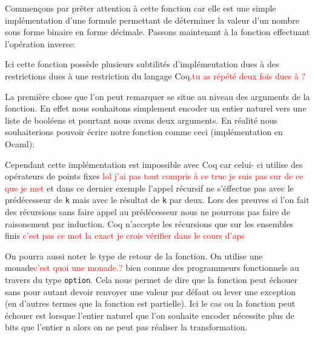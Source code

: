 \documentclass {article}
\newcommand{\codefrom}[3]
           {}
\newcommand{\codefromOcaml}[3]
           {}
\theoremstyle{definition}
\theoremstyle{remark}
\newcommand{\todo}[1]{\textcolor{red}{#1}}
\newcommand{\fun}[1]{\lstinline!#1!}
\begin{document}
\codefrom{src}{binary}{bitn}

Commençons par prêter attention à cette fonction car elle est une simple implémentation
d'une formule permettant de déterminer la valeur d'un nombre sous forme binaire
en forme décimale. Passons maintenant à la fonction effectuant l'opération inverse:

\codefrom{src}{binary}{nbit}


Ici cette fonction possède plusieurs subtilités d'implémentation dues à des restrictions dues
à une restriction du langage Coq.\todo{tu as répété deux fois dues à ?}

La première chose que l'on peut remarquer se situe au niveau des arguments de
la fonction. En effet nous souhaitons simplement encoder un entier naturel vers
une liste de booléens et pourtant nous avons deux arguments.
En réalité nous souhaiterions pouvoir écrire notre fonction comme ceci
(implémentation en Ocaml):
\codefromOcaml{rapport}{example}{nbit}

Cependant cette implémentation est impossible avec Coq car celui- ci utilise
des opérateurs de points fixes \todo{lol j'ai pas tout compris à ce truc je suis
  pas sur de ce que je met} et dans ce dernier exemple l'appel récursif ne s'éffectue
pas avec le prédécesseur de \fun{k}  mais avec le
résultat de \fun{k} par deux. Lors des preuves si l'on fait des récursions sans faire appel
au prédécesseur nous ne pourrons pas faire de raisonement par induction. Coq n'accepte les
récursions que sur les ensembles finis \todo{c'est pas ce mot la exact je crois vérifier dans le cours d'aps}



On pourra aussi noter le type de retour de la fonction.
On utilise une monade\todo{c'est quoi une monade.?} bien connue des programmeurs fonctionnels au travers du type
\fun{option}. Cela nous permet de
dire que la fonction peut échouer sans pour autant devoir renvoyer une valeur par
défaut ou lever une exception (en d'autres termes que la fonction est partielle). Ici le cas ou la fonction peut échouer est lorsque
l'entier naturel que l'on souhaite encoder nécessite plus de bits que l'entier n alors
on ne peut pas réaliser la transformation.
\end{document}
